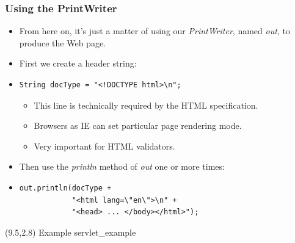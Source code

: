 \documentclass[10pt,xcolor=pdflatex]{beamer}
\begin{document}
\begin{frame}[containsverbatim]\frametitle{Using the PrintWriter}
\begin{itemize}
	\item From here on, it’s just a matter of using our \emph{PrintWriter}, named \emph{out}, to produce the Web page.
	\item First we create a header string:
    \item[] \begin{footnotesize} \begin{verbatim}String docType = "<!DOCTYPE html>\n"; \end{verbatim} \end{footnotesize}
      \begin{itemize}
    	\item This line is technically required by the HTML specification.
		\item Browsers as IE can set particular page rendering mode. 
        \item Very important for HTML validators.
      \end{itemize}
    \item Then use the \emph{println} method of \emph{out} one or more times:
    \item[] \begin{footnotesize} \begin{verbatim}
out.println(docType +  
            "<html lang=\"en\">\n" +                    
            "<head> ... </body></html>");
\end{verbatim} \end{footnotesize}
\end{itemize}
  \begin{textblock}{5}(9.5,2.8)
    {\footnotesize Example servlet\_example}
  \end{textblock}
\end{frame}
\end{document}
